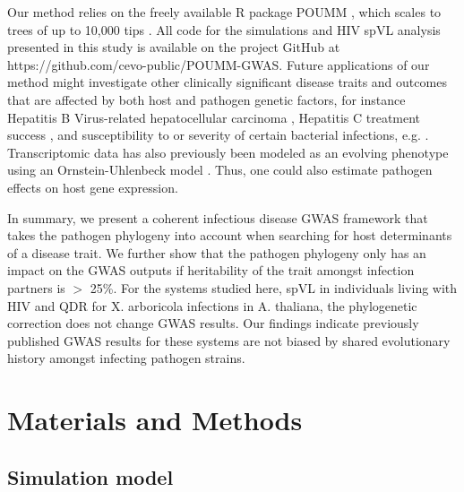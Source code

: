 \documentclass[11pt]{article}
\begin{document}
\begin{linenumbers}
Our method relies on the freely available R package POUMM \citep{Mitov2017a-POUMM}, which scales to trees of up to 10,000 tips \citep{Mitov2019}. All code for the simulations and HIV spVL analysis presented in this study is available on the project GitHub at https://github.com/cevo-public/POUMM-GWAS. Future applications of our method might investigate other clinically significant disease traits and outcomes that are affected by both host and pathogen genetic factors, for instance Hepatitis B Virus-related hepatocellular carcinoma \citep{An2018HostCarcinoma}, Hepatitis C treatment success \citep{Ansari2017Genome-to-genomeVirus}, and susceptibility to or severity of certain bacterial infections, e.g. \cite{Messina2016ImpactInfections, Donnenberg2015BacterialStudies}. Transcriptomic data has also previously been modeled as an evolving phenotype using an Ornstein-Uhlenbeck model \citep{Rohlfs2014ModelingVariation}. Thus, one could also estimate pathogen effects on host gene expression.

In summary, we present a coherent infectious disease GWAS framework that takes the pathogen phylogeny into account when searching for host determinants of a disease trait. We further show that the pathogen phylogeny only has an impact on the GWAS outputs if heritability of the trait amongst infection partners is $>$ 25\%.
For the systems studied here, spVL in individuals living with HIV and QDR for X. arboricola infections in A. thaliana, the phylogenetic correction does not change GWAS results. Our findings indicate previously published GWAS results for these systems are not biased by shared evolutionary history amongst infecting pathogen strains.

\section*{Materials and Methods}

\subsection*{Simulation model}


\end{linenumbers}
\end{document}
